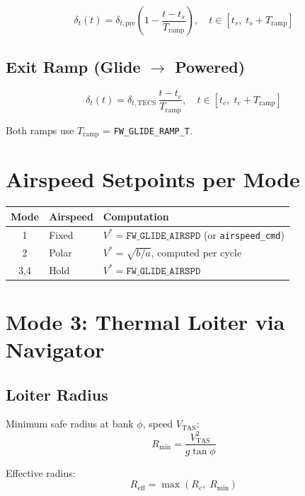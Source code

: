 \documentclass[12pt,a4paper]{report}
\begin{document}
\begin{equation}
  \delta_t(t) = \delta_{t,\text{pre}}\left(1 - \frac{t - t_s}{T_{\text{ramp}}}\right), \quad t \in [t_s,\; t_s + T_{\text{ramp}}]
\end{equation}

\subsection{Exit Ramp (Glide $\rightarrow$ Powered)}

\begin{equation}
  \delta_t(t) = \delta_{t,\text{TECS}}\,\frac{t - t_e}{T_{\text{ramp}}}, \quad t \in [t_e,\; t_e + T_{\text{ramp}}]
\end{equation}

Both ramps use $T_{\text{ramp}}$ = \texttt{FW\_GLIDE\_RAMP\_T}.

\section{Airspeed Setpoints per Mode}

\begin{center}
\begin{tabular}{clp{7cm}}
\toprule
Mode & Airspeed & Computation \\
\midrule
1 & Fixed & $V^* = \texttt{FW\_GLIDE\_AIRSPD}$ (or \texttt{airspeed\_cmd}) \\
2 & Polar & $V^* = \sqrt{b/a}$, computed per cycle \\
3,4 & Hold & $V^* = \texttt{FW\_GLIDE\_AIRSPD}$ \\
\bottomrule
\end{tabular}
\end{center}

\section{Mode 3: Thermal Loiter via Navigator}

\subsection{Loiter Radius}

Minimum safe radius at bank $\phi$, speed $V_{\text{TAS}}$:
\begin{equation}
  R_{\min} = \frac{V_{\text{TAS}}^2}{g\tan\phi}
\end{equation}

Effective radius:
\begin{equation}
  R_{\text{eff}} = \max(R_c,\; R_{\min})
\end{equation}
\end{document}
